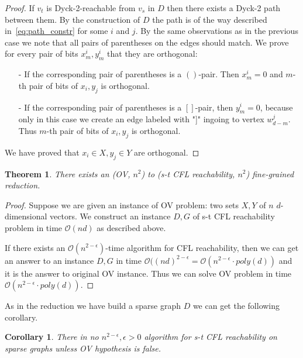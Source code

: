 \documentclass[12pt]{article}
\newtheorem{theorem}{Theorem}[section]
\newtheorem{cor}{Corollary}[section]
\begin{document}
\begin{proof}
If $v_t$ is Dyck-2-reachable from $v_s$ in $D$ then there exists a Dyck-2 path between them. By the construction of $D$ the path is of the way described in~\eqref{eq:path_constr} for some $i$ and $j$. By the same observations as in the previous case we note that all pairs of parentheses on the edges should match. We prove for every pair of bits $x^i_m, y^i_m$ that they are orthogonal:

\begin{itemize}
    \item[-] If the corresponding pair of parentheses is a $()$-pair. Then $x^i_m = 0$ and $m$-th pair of bits of $x_i, y_j$ is orthogonal. 
    
    \item[-] If the corresponding pair of parentheses is a $[]$-pair, then $y^i_m = 0$, because only in this case we create an edge labeled with "]" ingoing to vertex $w^j_{d-m}$. Thus $m$-th pair of bits of $x_i, y_j$ is orthogonal.
\end{itemize}

We have proved that $x_i \in X, y_j \in Y$ are orthogonal.
\end{proof}

\begin{theorem}
There exists an (OV, $n^2$) to (s-t CFL reachability, $n^2$) fine-grained reduction.
\end{theorem}

\begin{proof}
Suppose we are given an instance of OV problem: two sets $X, Y$ of $n$ $d$-dimensional vectors. We construct an instance $D, G$ of s-t CFL reachability problem in time $\mathcal{O}(nd)$ as described above.

If there exists an $\mathcal{O}(n^{2-\epsilon})$-time algorithm for CFL reachability, then we can get an answer to an instance $D, G$ in time $\mathcal{O}((nd)^{2-\epsilon} = \mathcal{O}(n^{2-\epsilon} \cdot poly(d))$ and it is the answer to original OV instance. Thus we can solve OV problem in time $\mathcal{O}(n^{2-\epsilon} \cdot poly(d))$.
\end{proof}

As in the reduction we have build a sparse graph $D$ we can get the following corollary.

\begin{cor}
There in no $n^{2-\epsilon}, \epsilon >0$ algorithm for s-t CFL reachability on sparse graphs unless OV hypothesis is false.
\end{cor}
\end{document}
